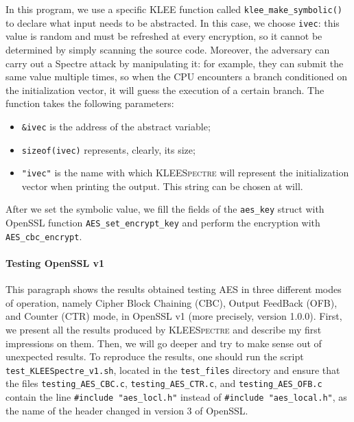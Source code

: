 \documentclass[12pt,a4paper]{book}
\theoremstyle{definition}
\begin{document}
	In this program, we use a specific \textsc{KLEE} function called \texttt{klee\_make\_symbolic()} to declare what input needs to be abstracted. In this case, we choose \texttt{ivec}: this value is random and must be refreshed at every encryption, so it cannot be determined by simply scanning the source code. Moreover, the adversary can carry out a Spectre attack by manipulating it: for example, they can submit the same value multiple times, so when the CPU encounters a branch conditioned on the initialization vector, it will guess the execution of a certain branch. The function takes the following parameters:
	\begin{itemize}
		\item \texttt{\&ivec} is the address of the abstract variable;
		\item \texttt{sizeof(ivec)} represents, clearly, its size;
		\item \texttt{"ivec"} is the name with which \textsc{KLEESpectre} will represent the initialization vector when printing the output. This string can be chosen at will.
	\end{itemize}
	After we set the symbolic value, we fill the fields of the \texttt{aes\_key} struct with OpenSSL function \texttt{AES\_set\_encrypt\_key} and perform the encryption with \texttt{AES\_cbc\_encrypt}.
	
	\paragraph{Testing OpenSSL v1} This paragraph shows the results obtained testing AES in three different modes of operation, namely Cipher Block Chaining (CBC), Output FeedBack (OFB), and Counter (CTR) mode, in OpenSSL v1 (more precisely, version 1.0.0). First, we present all the results produced by \textsc{KLEESpectre} and describe my first impressions on them. Then, we will go deeper and try to make sense out of unexpected results. 
	To reproduce the results, one should run the script \texttt{test\_KLEESpectre\_v1.sh}, located in the \texttt{test\_files} directory and ensure that the files \texttt{testing\_AES\_CBC.c}, \texttt{testing\_AES\_CTR.c}, and \texttt{testing\_AES\_OFB.c} contain the line \texttt{\#include "aes\_locl.h"} instead of \texttt{\#include "aes\_local.h"}, as the name of the header changed in version 3 of OpenSSL.
	
\end{document}
